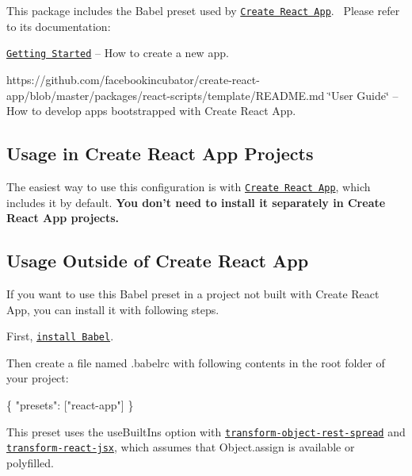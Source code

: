 This package includes the Babel preset used by \href{https://github.com/facebookincubator/create-react-app}{\tt Create React App}.~\newline
 Please refer to its documentation\+:


\begin{DoxyItemize}
\item \href{https://github.com/facebookincubator/create-react-app/blob/master/README.md#getting-started}{\tt Getting Started} – How to create a new app.
\item https\+://github.com/facebookincubator/create-\/react-\/app/blob/master/packages/react-\/scripts/template/\+R\+E\+A\+D\+M\+E.\+md \char`\"{}\+User Guide\char`\"{} – How to develop apps bootstrapped with Create React App.
\end{DoxyItemize}

\subsection*{Usage in Create React App Projects}

The easiest way to use this configuration is with \href{https://github.com/facebookincubator/create-react-app}{\tt Create React App}, which includes it by default. {\bfseries You don’t need to install it separately in Create React App projects.}

\subsection*{Usage Outside of Create React App}

If you want to use this Babel preset in a project not built with Create React App, you can install it with following steps.

First, \href{https://babeljs.io/docs/setup/}{\tt install Babel}.

Then create a file named {\ttfamily .babelrc} with following contents in the root folder of your project\+:


\begin{DoxyCode}
\{
  "presets": ["react-app"]
\}
\end{DoxyCode}


This preset uses the {\ttfamily use\+Built\+Ins} option with \href{http://babeljs.io/docs/plugins/transform-object-rest-spread/}{\tt transform-\/object-\/rest-\/spread} and \href{http://babeljs.io/docs/plugins/transform-react-jsx/}{\tt transform-\/react-\/jsx}, which assumes that {\ttfamily Object.\+assign} is available or polyfilled. 